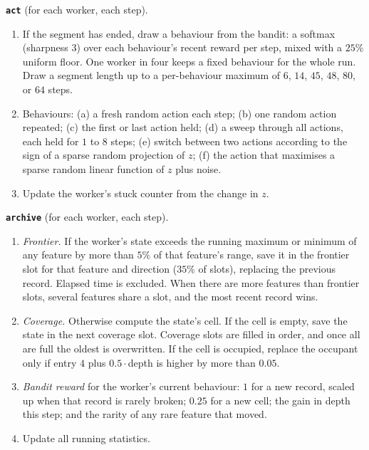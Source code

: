 \documentclass{article}
\begin{document}
\textbf{\texttt{act}} (for each worker, each step).
\begin{enumerate}
\item If the segment has ended, draw a behaviour from the bandit: a softmax (sharpness $3$) over each behaviour's recent
reward per step, mixed with a $25\%$ uniform floor. One worker in four keeps a fixed behaviour for the whole run. Draw a
segment length up to a per-behaviour maximum of $6$, $14$, $45$, $48$, $80$, or $64$ steps.
\item Behaviours: (a) a fresh random action each step; (b) one random action repeated; (c) the first or last action held;
(d) a sweep through all actions, each held for $1$ to $8$ steps; (e) switch between two actions according to the sign of
a sparse random projection of $z$; (f) the action that maximises a sparse random linear function of $z$ plus noise.
\item Update the worker's stuck counter from the change in $z$.
\end{enumerate}

\textbf{\texttt{archive}} (for each worker, each step).
\begin{enumerate}
\item \emph{Frontier.} If the worker's state exceeds the running maximum or minimum of any feature by more than $5\%$ of
that feature's range, save it in the frontier slot for that feature and direction ($35\%$ of slots), replacing the
previous record. Elapsed time is excluded. When there are more features than frontier slots, several features share a
slot, and the most recent record wins.
\item \emph{Coverage.} Otherwise compute the state's cell. If the cell is empty, save the state in the next coverage
slot. Coverage slots are filled in order, and once all are full the oldest is overwritten. If the cell is occupied,
replace the occupant only if entry $4$ plus $0.5\cdot$depth is higher by more than $0.05$.
\item \emph{Bandit reward} for the worker's current behaviour: $1$ for a new record, scaled up when that record is rarely
broken; $0.25$ for a new cell; the gain in depth this step; and the rarity of any rare feature that moved.
\item Update all running statistics.
\end{enumerate}
\end{document}
